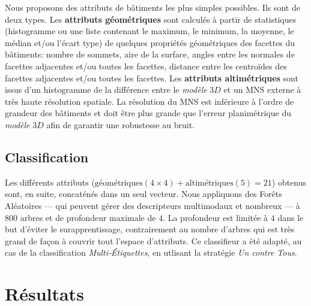 \documentclass[a4paper,french]{article}
\begin{document}
    Nous proposons des attributs de bâtiments les plus simples possibles. Ils sont de deux types. Les \textbf{attributs géométriques} sont calculés à partir de statistiques (histogramme ou une liste contenant le maximum, le minimum, la moyenne, le médian et/ou l'écart type) de quelques propriétés géométriques des facettes du bâtiments: nombre de sommets, aire de la surface, angles entre les normales de facettes adjacentes et/ou toutes les facettes, distance entre les centroïdes des facettes adjacentes et/ou toutes les facettes. Les \textbf{attributs altimétriques} sont issus d'un histogramme de la différence entre le \emph{modèle} $3D$ et un MNS externe à très haute résolution spatiale. {\color{black}La résolution du MNS est inférieure à l'ordre de grandeur des bâtiments et doit être plus grande que l'erreur planimétrique du \emph{modèle} $3D$ afin de garantir une robustesse au bruit.}
    \subsection{Classification}

    Les différents attributs ($\text{géométriques}(4\times4) + \text{altimétriques}(5) = 21$) obtenus sont, en suite, concaténés dans un seul vecteur. Nous appliquons des Forêts Aléatoires --- qui peuvent gérer des descripteurs multimodaux et nombreux --- à $800$ arbres et de profondeur maximale de $4$. {\color{black}La profondeur est limitée à $4$ dans le but d'éviter le surapprentissage, contrairement au nombre d'arbres qui est très grand de façon à couvrir tout l'espace d'attributs}. Ce classifieur a été adapté, au cas de la classification \emph{Multi-\'Etiquettes}, en utlisant la stratégie \emph{Un contre Tous}.

    \section{Résultats}
\end{document}
